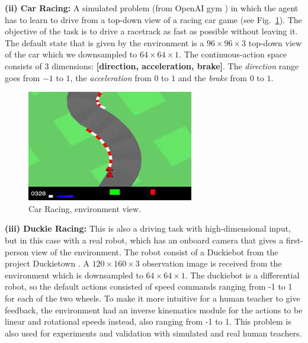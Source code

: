 \textbf{(ii) Car Racing:} A simulated problem (from OpenAI gym \cite{brockman2016openai}) in which the agent has to learn to drive from a top-down view of a racing car game (see Fig.~\ref{fig:Car_Racing}). The objective of the task is to drive a racetrack as fast as possible without leaving it. The default state that is given by the environment is a $96\times96\times3$ top-down view of the car which we downsampled to $64\times64\times1$. The continuous-action space consists of 3 dimensions: \textbf{[direction, acceleration, brake]}. The \emph{direction} range goes from $-1$ to $1$, the \emph{acceleration} from $0$ to $1$ and the \emph{brake} from $0$ to $1$.

\begin{figure}[h]
    \centering
    \includegraphics[scale=0.8]{imagenes/cap3/car_racing_env.jpg}
    \caption{Car Racing, environment view.}
    \label{fig:Car_Racing}
\end{figure}

\textbf{(iii) Duckie Racing:} This is also a driving task with high-dimensional input, but in this case with a real robot, which has an onboard camera that gives a first-person view of the environment. The robot consist of a Duckiebot from the project Duckietown \cite{Paull2017}. A $120\times160\times3$ observation image is received from the environment which is downsampled to $64\times64\times1$. The duckiebot is a differential robot, so the default actions consisted of speed commands ranging from -1 to 1 for each of the two wheels. To make it more intuitive for a human teacher to give feedback, the environment had an inverse kinematics module for the actions to be linear and rotational speeds instead, also ranging from -1 to 1. This problem is also used for experiments and validation with simulated and real human teachers.

